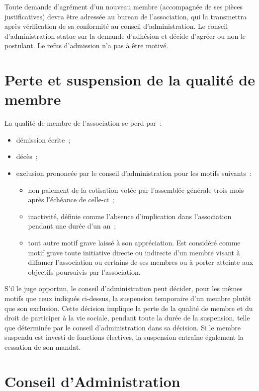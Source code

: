 \documentclass[12 pt]{article}
\begin{document}
Toute demande d'agrément d'un nouveau membre (accompagnée de ses
pièces justificatives) devra être adressée au bureau de l'association,
qui la transmettra après vérification de sa conformité au conseil
d'administration. Le conseil d'administration statue sur la demande
d'adhésion et décide d'agréer ou non le postulant. Le refus
d'admission n'a pas à être motivé.

\section{Perte et suspension de la qualité de membre}
\label{sec:perte-et-suspension-de-la-qualite-de-membre}

La qualité de membre de l'association se perd par :

\begin{itemize}
\item démission écrite~;
\item décès~;
\item exclusion prononcée par le conseil d'administration pour les
  motifs suivants~:
  \begin{itemize}
  \item non paiement de la cotisation votée par l'assemblée générale
    trois mois après l'échéance de celle-ci~;
  \item inactivité, définie comme l'absence d'implication dans
    l'association pendant une durée d'un an~;
  \item tout autre motif grave laissé à son appréciation. Est
    considéré comme motif grave toute initiative directe ou indirecte
    d'un membre visant à diffamer l'association ou certains de ses
    membres ou à porter atteinte aux objectifs poursuivis par
    l'association.
  \end{itemize}
\end{itemize}

S'il le juge opportun, le conseil d'administration peut décider, pour
les mêmes motifs que ceux indiqués ci-dessus, la suspension temporaire
d'un membre plutôt que son exclusion.  Cette décision implique la
perte de la qualité de membre et du droit de participer à la vie
sociale, pendant toute la durée de la suspension, telle que déterminée
par le conseil d'administration dans sa décision. Si le membre
suspendu est investi de fonctions électives, la suspension entraîne
également la cessation de son mandat.

\section{Conseil d'Administration}
\label{sec:administration}
\end{document}
